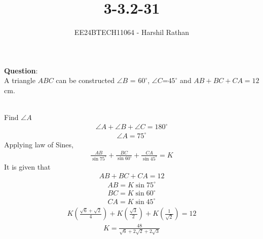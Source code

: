 \documentclass[journal]{IEEEtran}
\begin{document}

\vspace{3cm}

\title{3-3.2-31}
\author{EE24BTECH11064 - Harshil Rathan}
{\let\newpage\relax\maketitle}

\renewcommand{\thefigure}{\theenumi}
\renewcommand{\thetable}{\theenumi}
\setlength{\intextsep}{10pt} %


\renewcommand{\thetable}{\theenumi}
\textbf{Question}:\\
A triangle $ABC$ can be constructed $\angle{B}$ = $60^\circ$, $\angle{C}$=$45^\circ$ and $AB+BC+CA=12$cm.
\\
\solution \\
\begin{table}[h!]
    \centering
    
\end{table}
Find $\angle{A}$
\begin{align}
     \angle{A}+\angle{B}+\angle{C}=180^\circ 
\end{align}    
\begin{align}    
     \angle{A}=75^\circ
\end{align}
Applying law of Sines,
\begin{align}
          \frac{AB}{\sin{75^\circ}} + \frac{BC}{\sin{60^\circ}}+\frac{CA}{\sin{45^\circ}}=K
\end{align}
It is given that 
\begin{align}
 AB+BC+CA=12
\end{align}
\begin{align}
    AB =K \sin{75^\circ} 
    \label{0.5}
\end{align}
\begin{align}
    BC =K \sin{60^\circ}
    \label{0.6}
\end{align}
\begin{align}
    CA =K \sin{45^\circ}
    \label{0.7}
\end{align}
\begin{align}
    K(\frac{\sqrt{6}+\sqrt{2}}{4})+K(\frac{\sqrt{3}}{2})+K(\frac{1}{\sqrt{2}})=12
\end{align}
\begin{align}
    K=\frac{48}{\sqrt{6}+2\sqrt{2}+2\sqrt{3}}
\end{align}
\end{document}

